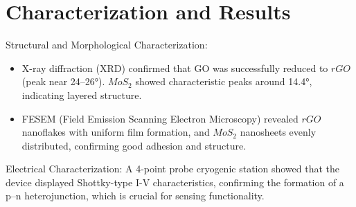 \documentclass[11pt,a5paper]{article}
\begin{document}
\vspace{-1.5em}
\section{Characterization and Results}
Structural and Morphological Characterization:
\vspace{-0.5em}
\begin{itemize}[itemsep=0pt]
    \item X-ray diffraction (XRD) confirmed that GO was successfully reduced to $rGO$ (peak near 24–26°).
    $MoS_{2}$ showed characteristic peaks around 14.4°, indicating layered structure.
    \item FESEM (Field Emission Scanning Electron Microscopy) revealed $rGO$ nanoflakes with uniform film formation, and
    $MoS_{2}$ nanosheets evenly distributed, confirming good adhesion and structure.
\end{itemize}

Electrical Characterization:
A 4-point probe cryogenic station showed that the device displayed Shottky-type I-V characteristics,
confirming the formation of a p–n heterojunction, which is crucial for sensing functionality.
\end{document}
